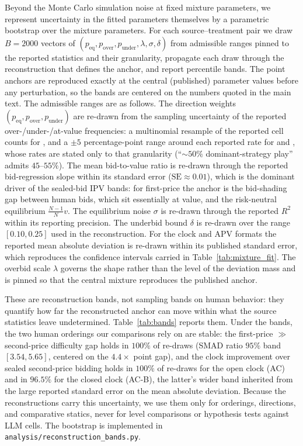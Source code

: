 \documentclass[acmsmall,screen,review]{acmart}
\newcommand{\rev}[1]{{\color{blue}#1}}
\newcommand{\rev}[1]{#1}
\begin{document}
Beyond the Monte Carlo simulation noise at fixed mixture parameters, we represent uncertainty in the fitted parameters themselves by a parametric bootstrap over the mixture parameters. For each source--treatment pair we draw $B=2000$ vectors of $(p_{\text{eq}}, p_{\text{over}}, p_{\text{under}}, \lambda, \sigma, \delta)$ from admissible ranges pinned to the reported statistics and their granularity, propagate each draw through the reconstruction that defines the anchor, and report percentile bands. The point anchors are reproduced exactly at the central (published) parameter values before any perturbation, so the bands are centered on the numbers quoted in the main text. The admissible ranges are as follows. The direction weights $(p_{\text{eq}}, p_{\text{over}}, p_{\text{under}})$ are re-drawn from the sampling uncertainty of the reported over-/under-/at-value frequencies: a multinomial resample of the reported cell counts for \citet{kagel1993independent}, and a $\pm 5$ percentage-point range around each reported rate for \citet{li2017obviously} and \citet{breitmoser2022obviousness}, whose rates are stated only to that granularity (``${\sim}50\%$ dominant-strategy play'' admits $45$--$55\%$). The mean bid-to-value ratio is re-drawn through the reported bid-regression slope within its standard error ($\mathrm{SE}\approx 0.01$), which is the dominant driver of the sealed-bid IPV bands: for first-price the anchor is the bid-shading gap between human bids, which sit essentially at value, and the risk-neutral equilibrium $\tfrac{N-1}{N}v$. The equilibrium noise $\sigma$ is re-drawn through the reported $R^2$ within its reporting precision. The underbid bound $\delta$ is re-drawn over the range $[0.10, 0.25]$ used in the reconstruction. For the clock and APV formats the reported mean absolute deviation is re-drawn within its published standard error, which reproduces the confidence intervals carried in Table~\ref{tab:mixture_fit}. The overbid scale $\lambda$ governs the shape rather than the level of the deviation mass and is pinned so that the central mixture reproduces the published anchor.

These are reconstruction bands, not sampling bands on human behavior: they quantify how far the reconstructed anchor can move within what the source statistics leave undetermined. Table~\ref{tab:bands} reports them. Under the bands, the two human orderings our comparisons rely on are stable: the first-price $\gg$ second-price difficulty gap holds in $100\%$ of re-draws (SMAD ratio $95\%$ band $[3.54, 5.65]$, centered on the $4.4\times$ point gap), and the clock improvement over sealed second-price bidding holds in $100\%$ of re-draws for the open clock (AC) and in \rev{$96.5\%$} for the closed clock (AC-B), the latter's wider band inherited from the large reported standard error on the \citet{breitmoser2022obviousness} mean absolute deviation. Because the reconstructions carry this uncertainty, we use them only for orderings, directions, and comparative statics, never for level comparisons or hypothesis tests against LLM cells. The bootstrap is implemented in \texttt{analysis/reconstruction\_bands.py}.
\end{document}
